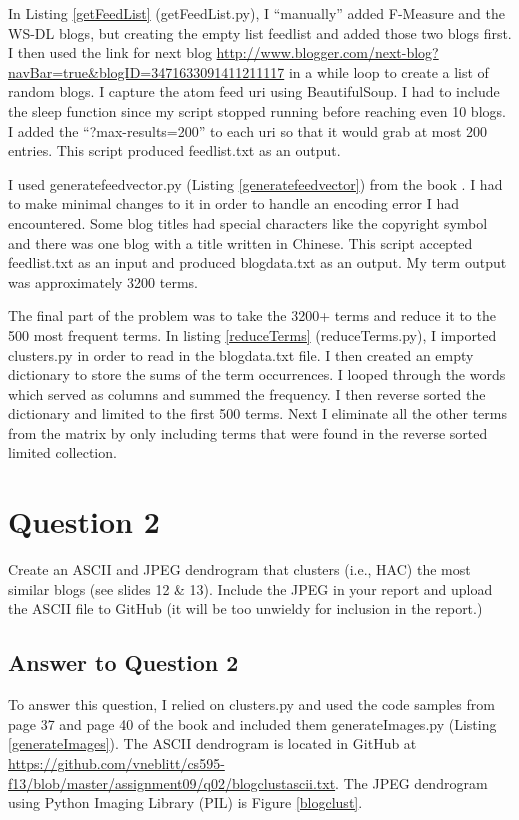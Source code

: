 \documentclass{article}
\begin{document}
In Listing \ref{getFeedList} (getFeedList.py), I ``manually'' added F-Measure and the WS-DL blogs, but creating the empty list feedlist and added those two blogs first. I then used the link for next blog \url{http://www.blogger.com/next-blog?navBar=true&blogID=3471633091411211117} in a while loop to create a list of random blogs. I capture the atom feed uri using BeautifulSoup. I had to include the sleep function since my script stopped running before reaching even 10 blogs. I added the ``?max-results=200'' to each uri so that it would grab at most 200 entries. This script produced feedlist.txt as an output.

I used generatefeedvector.py (Listing \ref{generatefeedvector}) from the book \cite{pci}. I had to make minimal changes to it in order to handle an encoding error I had encountered. Some blog titles had special characters like the copyright symbol and there was one blog with a title written in Chinese. This script accepted feedlist.txt as an input and produced blogdata.txt as an output. My term output was approximately 3200 terms.

The final part of the problem was to take the 3200+ terms and reduce it to the 500 most frequent terms. In listing \ref{reduceTerms} (reduceTerms.py), 
I imported clusters.py in order to read in the blogdata.txt file. I then created an empty dictionary to store the sums of the term occurrences. I looped through the words which served as columns and summed the frequency. I then reverse sorted the dictionary and limited to the first 500 terms. Next I eliminate all the other terms from the matrix by only including terms that were found in the reverse sorted limited collection.

\newpage
\section*{Question 2}
Create an ASCII and JPEG dendrogram that clusters (i.e., HAC) the most similar blogs (see slides 12 \& 13). Include the JPEG in your report and upload the ASCII file to GitHub (it will be too unwieldy for inclusion in the report.)

\subsection*{Answer to Question 2}

To answer this question, I relied on clusters.py and used the code samples from page 37 and page 40 of the book \cite{pci} and included them generateImages.py (Listing \ref{generateImages}). The ASCII dendrogram is located in GitHub at \url{https://github.com/vneblitt/cs595-f13/blob/master/assignment09/q02/blogclustascii.txt}. The JPEG dendrogram using Python Imaging Library (PIL) is Figure \ref{blogclust}.
\end{document}
